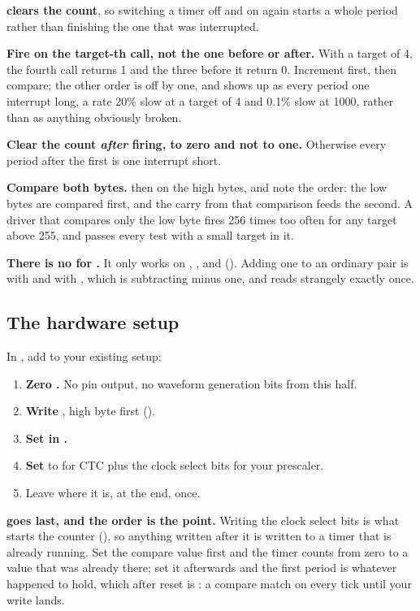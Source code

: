 \textbf{ clears the count}, so switching a timer off and on again starts a whole
period rather than finishing the one that was interrupted.

\textbf{Fire on the target-th call, not the one before or after.} With a target of 4, the fourth
call returns 1 and the three before it return 0. Increment first, then compare; the other order is
off by one, and shows up as every period one interrupt long, a rate 20\% slow at a target of 4 and
0.1\% slow at 1000, rather than as anything obviously broken.

\textbf{Clear the count \emph{after} firing, to zero and not to one.} Otherwise every period after
the first is one interrupt short.

\textbf{Compare both bytes.}  then  on the high bytes, and note the order: the
low bytes are compared first, and the carry from that comparison feeds the second. A driver that
compares only the low byte fires 256 times too often for any target above 255, and passes every
test with a small target in it.

\textbf{There is no  for .} It only works on , ,
 and  (). Adding one to an ordinary pair is 
with  and  with , which is subtracting minus one, and reads
strangely exactly once.

\subsection{The hardware setup}
\label{c5:sec:setup}
In , add to your existing setup:
\begin{enumerate}
  \item \textbf{Zero .} No pin output, no waveform generation bits from this half.
  \item \textbf{Write }, high byte first ().
  \item \textbf{Set  in .}
  \item \textbf{Set } to  for CTC plus the clock select bits for your
    prescaler.
  \item Leave  where it is, at the end, once.
\end{enumerate}

\textbf{ goes last, and the order is the point.} Writing the clock select bits is what
starts the counter (), so anything written after it is written to a timer
that is already running. Set the compare value first and the timer counts from zero to a value that
was already there; set it afterwards and the first period is whatever  happened to hold,
which after reset is : a compare match on every tick until your write lands.

